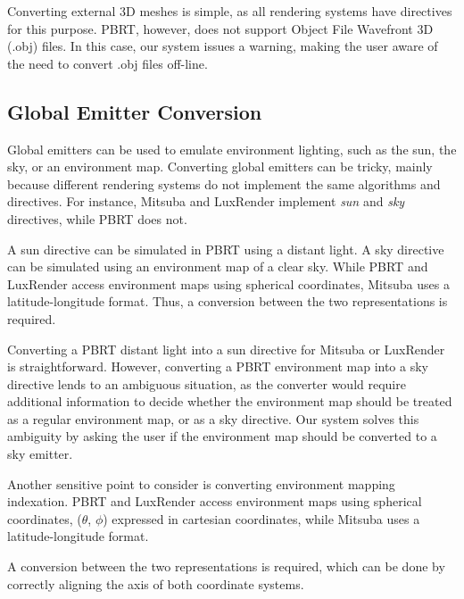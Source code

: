 Converting external 3D meshes is simple, as all rendering systems have directives for this purpose. PBRT, however, does not support Object File Wavefront 3D
(.obj) files. In this case, our system issues a warning, making the user aware of the need to convert .obj files off-line.

\subsection{Global Emitter Conversion}
Global emitters can be used to emulate environment lighting, such as the sun, the sky, or an environment map. Converting global emitters can be tricky, mainly
because different rendering systems do not implement the same algorithms and directives. For instance, Mitsuba and LuxRender implement {\it sun} and {\it sky} directives, while PBRT does not.

A sun directive can be simulated in PBRT using a distant light. A sky directive can be simulated using an environment map of a clear sky. While PBRT and LuxRender access environment maps using spherical coordinates, Mitsuba uses a latitude-longitude format. Thus, a conversion between the two representations is required. 
  
Converting a PBRT distant light into a sun directive for Mitsuba or LuxRender is straightforward. However, converting a PBRT environment map into a sky directive lends to an ambiguous situation, as the converter would require additional information to decide whether the environment map should be treated as a regular environment map, or as a sky directive. Our system solves this ambiguity by asking the user if the environment map should be converted to a sky
emitter.

Another sensitive point to consider is converting environment mapping indexation. PBRT and LuxRender access environment maps using spherical coordinates, 
($\theta$, $\phi$) expressed in cartesian coordinates, while Mitsuba uses a latitude-longitude format.   

A conversion between the two representations is required, which can be done by correctly aligning the axis of both coordinate systems. 

